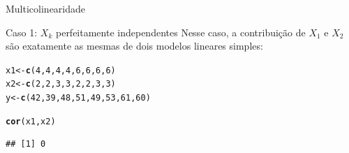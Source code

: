 \documentclass{beamer}\usepackage[]{graphicx}\usepackage[]{color}
\makeatletter
\newcommand{\hlnum}[1]{\textcolor[rgb]{0.686,0.059,0.569}{#1}}%
\newcommand{\hlstd}[1]{\textcolor[rgb]{0.345,0.345,0.345}{#1}}%
\newcommand{\hlkwb}[1]{\textcolor[rgb]{0.69,0.353,0.396}{#1}}%
\newcommand{\hlkwd}[1]{\textcolor[rgb]{0.737,0.353,0.396}{\textbf{#1}}}%
\newenvironment{kframe}{%
 \def\at@end@of@kframe{}%
 \ifinner\ifhmode%
  \def\at@end@of@kframe{\end{minipage}}%
  \begin{minipage}{\columnwidth}%
 \fi\fi%
 \def\FrameCommand##1{\hskip\@totalleftmargin \hskip-\fboxsep
 \colorbox{shadecolor}{##1}\hskip-\fboxsep
     \hskip-\linewidth \hskip-\@totalleftmargin \hskip\columnwidth}%
 \MakeFramed {\advance\hsize-\width
   \@totalleftmargin\z@ \linewidth\hsize
   \@setminipage}}%
 {\par\unskip\endMakeFramed%
 \at@end@of@kframe}
\newenvironment{knitrout}{}{} %
\renewenvironment{knitrout}{\setlength{\topsep}{0mm}}{}
\makeatother
\begin{document}
\begin{frame}[fragile]{Multicolinearidade}

Caso 1: $X_k$ perfeitamente independentes
\vfill
Nesse caso, a contribuição de $X_1$ e $X_2$ são exatamente as mesmas de dois modelos lineares simples:
\vfill
\begin{knitrout}\tiny
{}\color{fgcolor}\begin{kframe}
\begin{alltt}
\hlstd{x1} \hlkwb{<-} \hlkwd{c}\hlstd{(}\hlnum{4}\hlstd{,}\hlnum{4}\hlstd{,}\hlnum{4}\hlstd{,}\hlnum{4}\hlstd{,}\hlnum{6}\hlstd{,}\hlnum{6}\hlstd{,}\hlnum{6}\hlstd{,}\hlnum{6}\hlstd{)}
\hlstd{x2} \hlkwb{<-} \hlkwd{c}\hlstd{(}\hlnum{2}\hlstd{,}\hlnum{2}\hlstd{,}\hlnum{3}\hlstd{,}\hlnum{3}\hlstd{,}\hlnum{2}\hlstd{,}\hlnum{2}\hlstd{,}\hlnum{3}\hlstd{,}\hlnum{3}\hlstd{)}
\hlstd{y} \hlkwb{<-} \hlkwd{c}\hlstd{(}\hlnum{42}\hlstd{,}\hlnum{39}\hlstd{,}\hlnum{48}\hlstd{,}\hlnum{51}\hlstd{,}\hlnum{49}\hlstd{,}\hlnum{53}\hlstd{,}\hlnum{61}\hlstd{,}\hlnum{60}\hlstd{)}

\hlkwd{cor}\hlstd{(x1,x2)}
\end{alltt}
\begin{verbatim}
## [1] 0
\end{verbatim}
\end{kframe}
\end{knitrout}

\end{frame}
\end{document}
